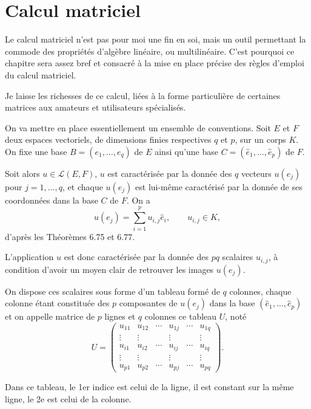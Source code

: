 \chapter{Calcul matriciel}

Le calcul matriciel n'est pas pour moi une fin en soi, mais un outil permettant la  commode des propriétés d'algèbre linéaire, ou multilinéaire. C'est pourquoi ce chapitre sera assez bref et consacré à la mise en place précise des règles d'emploi du calcul matriciel.

Je laisse les richesses de ce calcul, liées à la forme particulière de certaines matrices aux amateurs et utilisateurs spécialisés.


On va mettre en place essentiellement un ensemble de conventions. Soit $E$ et $F$ deux espaces vectoriels, de dimensions finies respectives $q$ et $p$, sur un corps $K$. On fixe une base $B=(e_1,\ldots,e_q)$ de $E$ ainsi qu'une base $C=(\hat e_1,\ldots,\hat e_p)$ de $F$.

Soit alors $u\in\mathcal L(E,F)$, $u$ est caractérisée par la donnée des $q$ vecteurs $u(e_j)$ pour $j=1,\ldots,q$, et chaque $u(e_j)$ est lui-même caractérisé par la donnée de ses coordonnées dans la base $C$ de $F$. On a
\[
\tag{8.1}
u(e_j)=\sum_{i=1}^{p}u_{i,j}\hat e_i,\qquad u_{i,j}\in K,
\]
d'après les Théorèmes 6.75 et 6.77.

L'application $u$ est donc caractérisée par la donnée des $pq$ scalaires $u_{i,j}$, à condition d'avoir un moyen clair de retrouver les images $u(e_j)$.

On dispose ces scalaires sous forme d'un tableau formé de $q$ colonnes, chaque colonne étant constituée des $p$ composantes de $u(e_j)$ dans la base $(\hat e_1,\ldots,\hat e_p)$ et on appelle matrice de $p$ lignes et $q$ colonnes ce tableau $U$, noté
\[
\tag{8.2}
U=\begin{pmatrix}
u_{11}&u_{12}&\cdots&u_{1j}&\cdots&u_{1q}\\
\vdots&\vdots&&\vdots&&\vdots\\
u_{i1}&u_{i2}&\cdots&u_{ij}&\cdots&u_{iq}\\
\vdots&\vdots&&\vdots&&\vdots\\
u_{p1}&u_{p2}&\cdots&u_{pj}&\cdots&u_{pq}
\end{pmatrix}.
\]

Dans ce tableau, le 1er indice est celui de la ligne, il est constant sur la même ligne, le 2e est celui de la colonne.

